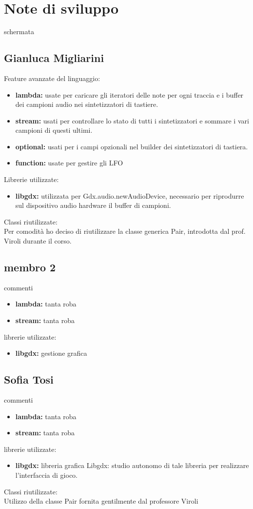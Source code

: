 \documentclass[a4paper,12pt]{report}
\begin{document}
\section{Note di sviluppo}
schermata
\newpage

\subsection{Gianluca Migliarini}
Feature avanzate del linguaggio:
\begin{itemize}
	\item \textbf{lambda:} usate per caricare gli iteratori delle note per ogni traccia e i buffer dei campioni audio nei sintetizzatori di tastiere.
	\item \textbf{stream:} usati per controllare lo stato di tutti i sintetizzatori e sommare i vari campioni di questi ultimi.
	\item \textbf{optional:} usati per i campi opzionali nel builder dei sintetizzatori di tastiera. 
	\item \textbf{function:} usate per gestire gli LFO
\end{itemize}
Librerie utilizzate:
\begin{itemize}
	\item \textbf{libgdx:} utilizzata per Gdx.audio.newAudioDevice, necessario per riprodurre sul dispositivo audio hardware il buffer di campioni.
\end{itemize}
Classi riutilizzate: \\
Per comodità ho deciso di riutilizzare la classe generica Pair, introdotta dal prof. Viroli durante il corso.
\newpage

\subsection{membro 2}
commenti
\begin{itemize}
	\item \textbf{lambda:} tanta roba
	\item \textbf{stream:} tanta roba
\end{itemize}
librerie utilizzate:
\begin{itemize}
	\item \textbf{libgdx:} gestione grafica
\end{itemize}
\newpage

\subsection{Sofia Tosi}
commenti
\begin{itemize}
	\item \textbf{lambda:} tanta roba
	\item \textbf{stream:} tanta roba
\end{itemize}
librerie utilizzate:
\begin{itemize}
	\item \textbf{libgdx:} libreria grafica Libgdx: studio autonomo di tale libreria per realizzare l'interfaccia di gioco.
\end{itemize}
Classi riutilizzate: \\
Utilizzo della classe Pair fornita gentilmente dal professore Viroli
\newpage
\end{document}

